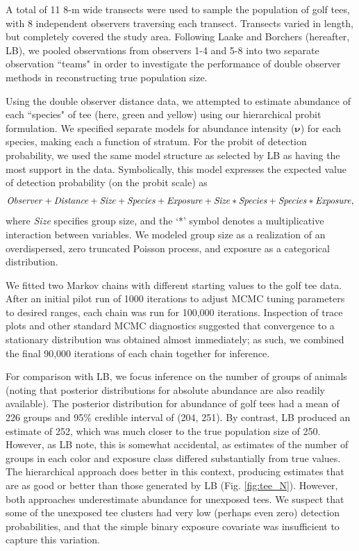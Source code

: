 \documentclass[10pt]{article}
\begin{document}
A total of 11 8-m wide transects were used to sample the population of golf tees, with 8 independent observers traversing each transect.  Transects varied in length, but completely covered the study area.  Following Laake and Borchers \cite{LaakeBorchers2004} (hereafter, LB), we pooled observations from observers 1-4 and 5-8 into two separate observation ``teams" in order to investigate the performance of double observer methods in reconstructing true population size.
 
Using the double observer distance data, we attempted to estimate abundance of each ``species" of tee (here, green and yellow) using our hierarchical probit formulation.  We specified separate models for abundance intensity ($\boldsymbol{\nu}$) for each species, making each a function of stratum. For the probit of detection probability, we used the same model structure as selected by LB as having the most support in the data.  Symbolically, this model expresses the expected value of detection probability (on the probit scale) as
$$
{\it Observer+Distance+Size+Species+Exposure+Size*Species+Species*Exposure},
$$
where {\it Size} specifies group size, and the `*' symbol denotes a multiplicative interaction between variables.  We modeled group size as a realization of an overdispersed, zero truncated Poisson process, and exposure as a categorical distribution.

We fitted two Markov chains with different starting values to the golf tee data.  After an initial pilot run of 1000 iterations to adjust MCMC tuning parameters to desired ranges, each chain was run for 100,000 iterations.  Inspection of trace plots and other standard MCMC diagnostics suggested that convergence to a stationary distribution was obtained almost immediately; as such, we combined the final 90,000 iterations of each chain together for inference.  

For comparison with LB, we focus inference on the number of groups of animals (noting that posterior distributions for absolute abundance are also readily available).  The posterior distribution for abundance of golf tees had a mean of 226 groups and 95\% credible interval of (204, 251).  By contrast, LB produced an estimate of 252, which was much closer to the true population size of 250.  However, as LB note, this is somewhat accidental, as estimates of the number of groups in each
color and exposure class differed substantially from true values.  The hierarchical approach does better in this context, producing estimates that are as good or better than those generated by LB (Fig. \ref{fig:tee_N}).  However, both approaches underestimate abundance for unexposed tees.  We suspect that some of the unexposed tee clusters had very low (perhaps even zero) detection probabilities, and that the simple binary exposure covariate was insufficient to capture this variation.
\end{document}
